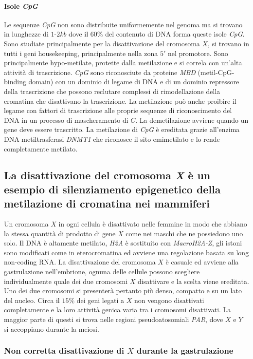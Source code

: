 \paragraph{Isole \emph{CpG}}
Le sequenze \emph{CpG} non sono distribuite uniformemente nel genoma ma si trovano in lunghezze di $1$-$2kb$ dove il $60\%$ del contenuto di DNA forma queste isole \emph{CpG}. Sono 
studiate principalmente per la disattivazione del cromosoma $X$, si trovano in tutti i geni housekeeping, principalmente nella zona $5'$ nel promotore. Sono principalmente hypo-metilate,
protette dalla metilazione e si correla con un'alta attivit\`a di trascrizione. \emph{CpG} sono riconosciute da proteine \emph{MBD} (metil-CpG-binding domain) con un dominio di legame
di DNA e di un dominio repressore della trascrizione che possono reclutare complessi di rimodellazione della cromatina che disattivano la trascrizione. La metilazione pu\`o anche
proibire il legame con fattori di trascrizione alle proprie sequenze di riconoscimento del DNA in un processo di mascheramento di $C$. La demetilazione avviene quando un gene deve
essere trascritto. La metilazione di \emph{CpG} \`e ereditata grazie all'enzima DNA metiltrasferasi \emph{DNMT1} che riconosce il sito emimetilato e lo rende completamente metilato.
\subsection{La disattivazione del cromosoma \emph{X} \`e un esempio di silenziamento epigenetico della metilazione di cromatina nei mammiferi}
Un cromosoma $X$ in ogni cellula \`e disattivato nelle femmine in modo che abbiano la stessa quantit\`a di prodotto di gene $X$ come nei maschi che ne possiedono uno solo. Il DNA 
\`e altamente metilato, \emph{H2A} \`e sostituito con \emph{MacroH2A-Z}, gli istoni sono modificati come in eterocromatina ed avviene una regolazione basata su long non-coding RNA. La
disattivazione del cromosoma $X$ \`e casuale ed avviene alla gastrulazione nell'embrione, ognuna delle cellule possono scegliere individualmente quale dei due cromosomi $X$ disattivare
e la scelta viene ereditata. Uno dei due cromosomi si presenter\`a pertanto pi\`u denso, compatto e su un lato del nucleo. Circa il $15\%$ dei geni legati a $X$ non vengono disattivati
completamente e la loro attivit\`a genica varia tra i cromosomi disattivati. La maggior parte di questi si trova nelle regioni pseudoatosomiali \emph{PAR}, dove $X$ e $Y$ si 
accoppiano durante la meiosi. 
\subsubsection{Non corretta disattivazione di $X$ durante la gastrulazione}
